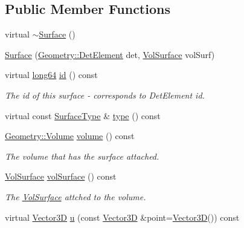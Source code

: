 \subsection*{Public Member Functions}
\begin{DoxyCompactItemize}
\item 
virtual \hyperlink{class_d_d4hep_1_1_d_d_rec_1_1_surface_aa336356bfc2c272c65b7fae46688dad5}{$\sim$\+Surface} ()
\item 
\hyperlink{class_d_d4hep_1_1_d_d_rec_1_1_surface_a1a4cca5bac129f897331f1df355c75d0}{Surface} (\hyperlink{class_d_d4hep_1_1_geometry_1_1_det_element}{Geometry\+::\+Det\+Element} det, \hyperlink{class_d_d4hep_1_1_d_d_rec_1_1_vol_surface}{Vol\+Surface} vol\+Surf)
\item 
virtual \hyperlink{namespace_d_d_surfaces_ab6b3da366f31f80aec56447ac4442e78}{long64} \hyperlink{class_d_d4hep_1_1_d_d_rec_1_1_surface_a5287eb53d729f58db5c14b6db98b1db7}{id} () const
\begin{DoxyCompactList}\small\item\em The id of this surface -\/ corresponds to Det\+Element id. \end{DoxyCompactList}\item 
virtual const \hyperlink{class_d_d_surfaces_1_1_surface_type}{Surface\+Type} \& \hyperlink{class_d_d4hep_1_1_d_d_rec_1_1_surface_a28bdf868a99ad7cdde62cb1b4309173d}{type} () const
\item 
\hyperlink{class_d_d4hep_1_1_geometry_1_1_volume}{Geometry\+::\+Volume} \hyperlink{class_d_d4hep_1_1_d_d_rec_1_1_surface_a739dcf7968a8b870744151b1ee99a3c4}{volume} () const
\begin{DoxyCompactList}\small\item\em The volume that has the surface attached. \end{DoxyCompactList}\item 
\hyperlink{class_d_d4hep_1_1_d_d_rec_1_1_vol_surface}{Vol\+Surface} \hyperlink{class_d_d4hep_1_1_d_d_rec_1_1_surface_acd276a07bb05cf375de83ad3d2a399d5}{vol\+Surface} () const
\begin{DoxyCompactList}\small\item\em The \hyperlink{class_d_d4hep_1_1_d_d_rec_1_1_vol_surface}{Vol\+Surface} attched to the volume. \end{DoxyCompactList}\item 
virtual \hyperlink{class_d_d_surfaces_1_1_vector3_d}{Vector3D} \hyperlink{class_d_d4hep_1_1_d_d_rec_1_1_surface_a1b69829495d4a43178222cc7a5b369da}{u} (const \hyperlink{class_d_d_surfaces_1_1_vector3_d}{Vector3D} \&point=\hyperlink{class_d_d_surfaces_1_1_vector3_d}{Vector3D}()) const

\end{DoxyCompactItemize}

